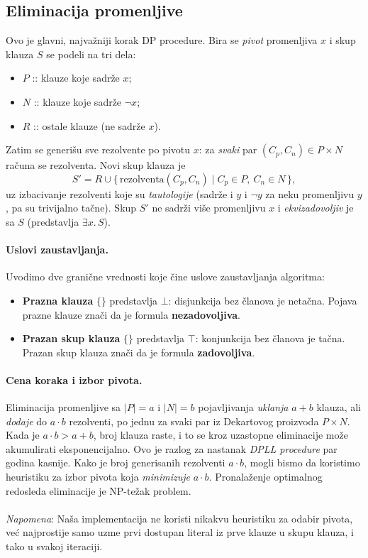 \documentclass[a4paper,10pt]{article}
\begin{document}
\subsection{Eliminacija promenljive}

Ovo je glavni, najvažniji korak DP procedure. Bira se \emph{pivot} promenljiva $x$ i skup klauza $S$ se podeli na tri dela:
\begin{itemize}
  \item $P$ :: klauze koje sadrže $x$;
  \item $N$ :: klauze koje sadrže $\neg x$;
  \item $R$ :: ostale klauze (ne sadrže $x$).
\end{itemize}
Zatim se generišu sve rezolvente po pivotu $x$: za \emph{svaki} par $(C_p, C_n) \in P \times N$ računa se rezolventa. Novi skup klauza je
\[
  S' = R \cup \{\, \text{rezolventa}(C_p, C_n) \mid C_p \in P,\ C_n \in N \,\},
\]
uz izbacivanje rezolventi koje su \emph{tautologije} (sadrže i $y$ i $\neg y$ za neku promenljivu $y$, pa su trivijalno tačne). Skup $S'$ ne sadrži više promenljivu $x$ i \emph{ekvizadovoljiv} je sa $S$ (predstavlja $\exists x.\, S$).

\paragraph{Uslovi zaustavljanja.} Uvodimo dve granične vrednosti koje čine uslove zaustavljanja algoritma:
\begin{itemize}
  \item \textbf{Prazna klauza} $\{\}$ predstavlja $\bot$: disjunkcija bez članova je netačna. Pojava prazne klauze znači da je formula \textbf{nezadovoljiva}.
  \item \textbf{Prazan skup klauza} $\{\}$ predstavlja $\top$: konjunkcija bez članova je tačna. Prazan skup klauza znači da je formula \textbf{zadovoljiva}.
\end{itemize}


\paragraph{Cena koraka i izbor pivota.} Eliminacija promenljive sa $|P| = a$ i $|N| = b$ pojavljivanja \emph{uklanja} $a + b$ klauza, ali \emph{dodaje} do $a \cdot b$ rezolventi, po jednu za svaki par iz Dekartovog proizvoda $P \times N$. Kada je $a \cdot b > a + b$, broj klauza raste, i to se kroz uzastopne eliminacije može akumulirati eksponencijalno. Ovo je razlog za nastanak \emph{DPLL procedure} par godina kasnije. Kako je broj generisanih rezolventi $a \cdot b$, mogli bismo da koristimo heuristiku za izbor pivota koja \emph{minimizuje} $a \cdot b$. Pronalaženje optimalnog redosleda eliminacije je NP-težak problem.
\\ \\
\emph{Napomena}: Naša implementacija ne koristi nikakvu heuristiku za odabir pivota, već najprostije samo uzme prvi dostupan literal iz prve klauze u skupu klauza, i tako u svakoj iteraciji.
\end{document}
